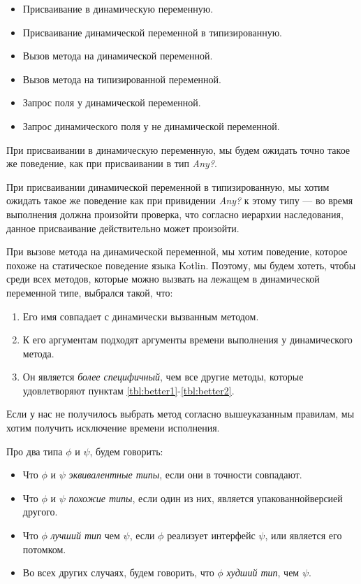 \begin{itemize}
    \item Присваивание в динамическую переменную.
    \item Присваивание динамической переменной в типизированную.
    \item Вызов метода на динамической переменной.
    \item Вызов метода на типизированной переменной.
    \item Запрос поля у динамической переменной.
    \item Запрос динамического поля у не динамической переменной.
\end{itemize}

При присваивании в динамическую переменную, мы будем ожидать точно такое же поведение, как при присваивании в тип \textit{Any?}.

При присваивании динамической переменной в типизированную, мы хотим ожидать такое же поведение как при привидении \textit{Any?} к этому типу --- во время выполнения должна произойти проверка, что согласно иерархии наследования, данное присваивание действительно может произойти.%

При вызове метода на динамической переменной, мы хотим поведение, которое похоже на статическое поведение языка Kotlin.
Поэтому, мы будем хотеть, чтобы среди всех методов, которые можно вызвать на лежащем в динамической переменной типе, выбрался такой, что:
\begin{enumerate}
    \item Его имя совпадает с динамически вызванным методом. \label{tbl:better1}
    \item К его аргументам подходят аргументы времени выполнения у динамического метода. \label{tbl:better2}
    \item Он является \textit{более специфичный}, чем все другие методы, которые удовлетворяют пунктам \ref{tbl:better1}-\ref{tbl:better2}.
\end{enumerate}

Если у нас не получилось выбрать метод согласно вышеуказанным правилам, мы хотим получить исключение времени исполнения.

Про два типа $\phi$ и $\psi$, будем говорить:
\begin{itemize}
    \item Что $\phi$ и $\psi$ \textit{эквивалентные типы}, если они в точности совпадают.
    \item Что $\phi$ и $\psi$ \textit{похожие типы}, если один из них, является упакованной\footnotemark       версией другого.
    \item Что $\phi$ \textit{лучший тип} чем  $\psi$, если $\phi$ реализует интерфейс $\psi$, или является его потомком.
    \item Во всех других случаях, будем говорить, что $\phi$ \textit{худший тип}, чем $\psi$.
\end{itemize}

